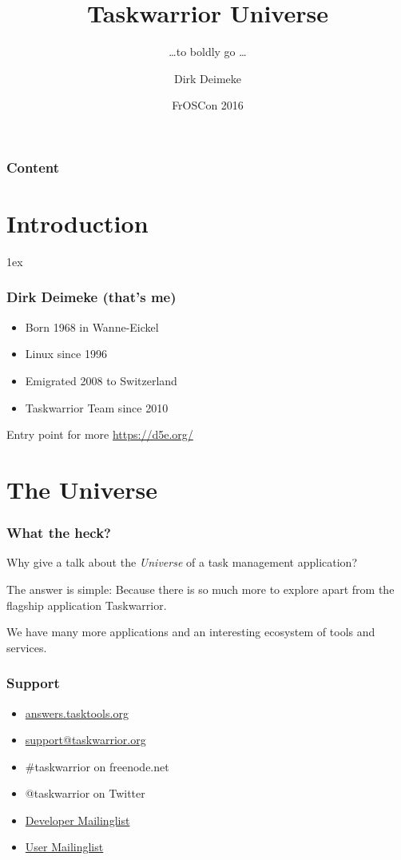 \documentclass[t]{beamer}
\title{Taskwarrior Universe}
\subtitle{\ldots to boldly go \ldots}
\author[Deimeke, Dirk]{Dirk Deimeke}
\institute[Taskwarrior academy]{Taskwarrior academy}
\date{FrOSCon 2016}
\begin{document}
\begin{frame} %
	\titlepage
\end{frame}


\begin{frame}\frametitle{Content}
	\tableofcontents
\end{frame}

\section{Introduction}

\parskip1ex

\begin{frame}[fragile]\frametitle{Dirk Deimeke (that's me)}
    \vfill
    \begin{itemize}
        \item Born 1968 in Wanne-Eickel
        \item Linux since 1996
        \item Emigrated 2008 to Switzerland
        \item Taskwarrior Team since 2010
    \end{itemize}

    Entry point for more \url{https://d5e.org/}
\end{frame}

\section{The Universe}

\begin{frame}[fragile]\frametitle{What the heck?}
    \vfill
    Why give a talk about the \textit{Universe} of a task management application? \pause

    The answer is simple: Because there is so much more to explore apart from the flagship application Taskwarrior.

    We have many more applications and an interesting ecosystem of tools and services.
\end{frame}

\begin{frame}\frametitle{Support}
    \vfill
    \begin{itemize}
        \item \href{https://answers.tasktools.org/}{answers.tasktools.org}
        \item \href{mailto:support@taskwarrior.org}{support@taskwarrior.org}
        \item \#taskwarrior on freenode.net
        \item @taskwarrior on Twitter
        \item \href{https://groups.google.com/forum/\#!forum/taskwarrior-dev}{Developer Mailinglist}
        \item \href{https://groups.google.com/forum/\#!forum/taskwarrior-user}{User Mailinglist}
    \end{itemize}
\end{frame}
\end{document}
